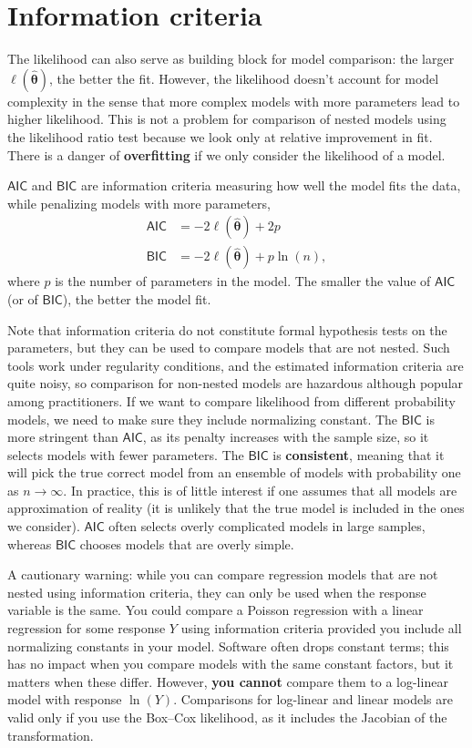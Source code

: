 \documentclass[
  11pt,
  letterpaper,
]{scrbook}
\theoremstyle{definition}
\theoremstyle{definition}
\theoremstyle{plain}
\theoremstyle{remark}
\begin{document}
\section{Information criteria}\label{information-criteria}

The likelihood can also serve as building block for model comparison:
the larger \(\ell(\boldsymbol{\widehat{\theta}})\), the better the fit.
However, the likelihood doesn't account for model complexity in the
sense that more complex models with more parameters lead to higher
likelihood. This is not a problem for comparison of nested models using
the likelihood ratio test because we look only at relative improvement
in fit. There is a danger of \textbf{overfitting} if we only consider
the likelihood of a model.

\(\mathsf{AIC}\) and \(\mathsf{BIC}\) are information criteria measuring
how well the model fits the data, while penalizing models with more
parameters, \begin{align*}
\mathsf{AIC}&=-2\ell(\widehat{\boldsymbol{\theta}})+2p \\
\mathsf{BIC}&=-2\ell(\widehat{\boldsymbol{\theta}})+p\ln(n),
\end{align*} where \(p\) is the number of parameters in the model. The
smaller the value of \(\mathsf{AIC}\) (or of \(\mathsf{BIC}\)), the
better the model fit.

Note that information criteria do not constitute formal hypothesis tests
on the parameters, but they can be used to compare models that are not
nested. Such tools work under regularity conditions, and the estimated
information criteria are quite noisy, so comparison for non-nested
models are hazardous although popular among practitioners. If we want to
compare likelihood from different probability models, we need to make
sure they include normalizing constant. The \(\mathsf{BIC}\) is more
stringent than \(\mathsf{AIC}\), as its penalty increases with the
sample size, so it selects models with fewer parameters. The
\(\mathsf{BIC}\) is \textbf{consistent}, meaning that it will pick the
true correct model from an ensemble of models with probability one as
\(n \to \infty\). In practice, this is of little interest if one assumes
that all models are approximation of reality (it is unlikely that the
true model is included in the ones we consider). \(\mathsf{AIC}\) often
selects overly complicated models in large samples, whereas
\(\mathsf{BIC}\) chooses models that are overly simple.

A cautionary warning: while you can compare regression models that are
not nested using information criteria, they can only be used when the
response variable is the same. You could compare a Poisson regression
with a linear regression for some response \(Y\) using information
criteria provided you include all normalizing constants in your model.
Software often drops constant terms; this has no impact when you compare
models with the same constant factors, but it matters when these differ.
However, \textbf{you cannot} compare them to a log-linear model with
response \(\ln(Y)\). Comparisons for log-linear and linear models are
valid only if you use the Box--Cox likelihood, as it includes the
Jacobian of the transformation.
\end{document}
